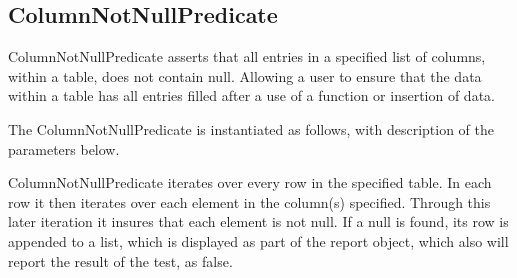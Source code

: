 \subsection{ColumnNotNullPredicate}
ColumnNotNullPredicate asserts that all entries in a specified list of columns, within a table, does not contain null. Allowing a user to ensure that the data within a table has all entries filled after a use of a function or insertion of data.

The ColumnNotNullPredicate is instantiated as follows, with description of the parameters below.


ColumnNotNullPredicate iterates over every row in the specified table. In each row it then iterates over each element in the column(s) specified. Through this later iteration it insures that each element is not null. If a null is found, its row is appended to a list, which is displayed as part of the report object, which also will report the result of the test, as false.

